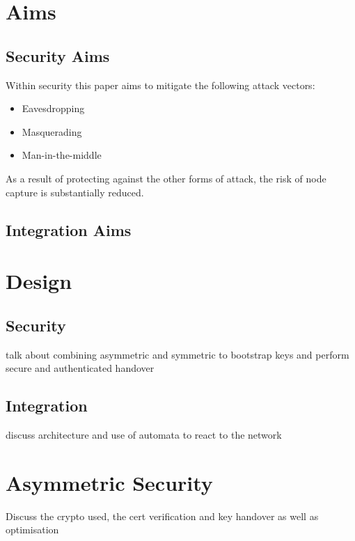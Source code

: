 \documentclass[conference]{./sty/IEEEtran}
\begin{document}

\section{Aims} %
\label{sec:aims}

\subsection{Security Aims} %
\label{sub:security_aims}

Within security this paper aims to mitigate the following attack vectors:
\begin{itemize}
  \item Eavesdropping
  \item Masquerading
  \item Man-in-the-middle
\end{itemize}
As a result of protecting against the other forms of attack, the risk of node capture is substantially reduced.
\subsection{Integration Aims} %
\label{sub:integration_aims}

\section{Design} %
\label{sec:design}
\subsection{Security} %
\label{sub:security}
talk about combining asymmetric and symmetric to bootstrap keys and perform secure and authenticated handover
\subsection{Integration} %
\label{sub:design_integration}
discuss architecture and use of automata to react to the network

\section{Asymmetric Security} %
\label{sec:asymmetric_security}
Discuss the crypto used, the cert verification and key handover as well as optimisation
\end{document}
